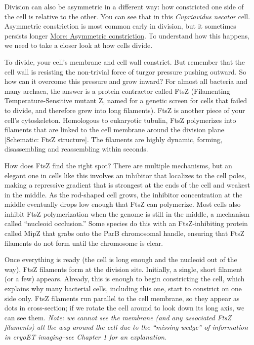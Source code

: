 \documentclass[]{tufte-book}
\begin{document}
Division can also be asymmetric in a different way: how constricted one
side of the cell is relative to the other. You can see that in this
\emph{Cupriavidus necator} cell. Asymmetric constriction is most common
early in division, but it sometimes persists longer
\protect\hyperlink{Asymmetric_constriction}{More: Asymmetric
constriction}. To understand how this happens, we need to take a closer
look at how cells divide.

To divide, your cell's membrane and cell wall constrict. But remember
that the cell wall is resisting the non-trivial force of turgor pressure
pushing outward. So how can it overcome this pressure and grow inward?
For almost all bacteria and many archaea, the answer is a protein
contractor called FtsZ (Filamenting Temperature-Sensitive mutant Z,
named for a genetic screen for cells that failed to divide, and
therefore grew into long filaments). FtsZ is another piece of your
cell's cytoskeleton. Homologous to eukaryotic tubulin, FtsZ polymerizes
into filaments that are linked to the cell membrane around the division
plane {[}Schematic: FtsZ structure{]}. The filaments are highly dynamic,
forming, disassembling and reassembling within seconds.

How does FtsZ find the right spot? There are multiple mechanisms, but an
elegant one in cells like this involves an inhibitor that localizes to
the cell poles, making a repressive gradient that is strongest at the
ends of the cell and weakest in the middle. As the rod-shaped cell
grows, the inhibitor concentration at the middle eventually drops low
enough that FtsZ can polymerize. Most cells also inhibit FtsZ
polymerization when the genome is still in the middle, a mechanism
called ``nucleoid occlusion.'' Some species do this with an
FtsZ-inhibiting protein called MipZ that grabs onto the ParB chromosomal
handle, ensuring that FtsZ filaments do not form until the chromosome is
clear.

Once everything is ready (the cell is long enough and the nucleoid out
of the way), FtsZ filaments form at the division site. Initially, a
single, short filament (or a few) appears. Already, this is enough to
begin constricting the cell, which explains why many bacterial cells,
including this one, start to constrict on one side only. FtsZ filaments
run parallel to the cell membrane, so they appear as dots in
cross-section; if we rotate the cell around to look down its long axis,
we can see them. \emph{Note: we cannot see the membrane (and any
associated FtsZ filaments) all the way around the cell due to the
``missing wedge'' of information in cryoET imaging--see Chapter 1 for an
explanation.}
\end{document}
